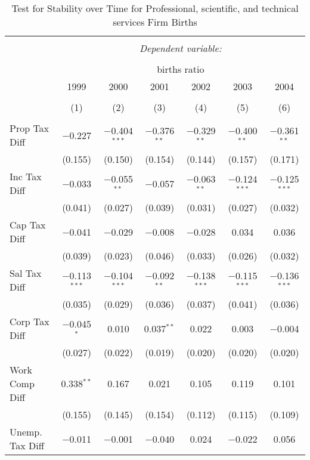 
\begin{table}[!htbp] \centering 
  \caption{Test for Stability over Time for  Professional, scientific, and technical services Firm Births} 
  \label{54year} 
\small 
\begin{tabular}{@{\extracolsep{5pt}}lcccccc} 
\\[-1.8ex]\hline 
\hline \\[-1.8ex] 
 & \multicolumn{6}{c}{\textit{Dependent variable:}} \\ 
\cline{2-7} 
\\[-1.8ex] & \multicolumn{6}{c}{births ratio} \\ 
 & 1999 & 2000 & 2001 & 2002 & 2003 & 2004 \\ 
\\[-1.8ex] & (1) & (2) & (3) & (4) & (5) & (6)\\ 
\hline \\[-1.8ex] 
 Prop Tax Diff & $-$0.227 & $-$0.404$^{***}$ & $-$0.376$^{**}$ & $-$0.329$^{**}$ & $-$0.400$^{**}$ & $-$0.361$^{**}$ \\ 
  & (0.155) & (0.150) & (0.154) & (0.144) & (0.157) & (0.171) \\ 
  Inc Tax Diff & $-$0.033 & $-$0.055$^{**}$ & $-$0.057 & $-$0.063$^{**}$ & $-$0.124$^{***}$ & $-$0.125$^{***}$ \\ 
  & (0.041) & (0.027) & (0.039) & (0.031) & (0.027) & (0.032) \\ 
  Cap Tax Diff & $-$0.041 & $-$0.029 & $-$0.008 & $-$0.028 & 0.034 & 0.036 \\ 
  & (0.039) & (0.023) & (0.046) & (0.033) & (0.026) & (0.032) \\ 
  Sal Tax Diff & $-$0.113$^{***}$ & $-$0.104$^{***}$ & $-$0.092$^{**}$ & $-$0.138$^{***}$ & $-$0.115$^{***}$ & $-$0.136$^{***}$ \\ 
  & (0.035) & (0.029) & (0.036) & (0.037) & (0.041) & (0.036) \\ 
  Corp Tax Diff & $-$0.045$^{*}$ & 0.010 & 0.037$^{**}$ & 0.022 & 0.003 & $-$0.004 \\ 
  & (0.027) & (0.022) & (0.019) & (0.020) & (0.020) & (0.020) \\ 
  Work Comp Diff & 0.338$^{**}$ & 0.167 & 0.021 & 0.105 & 0.119 & 0.101 \\ 
  & (0.155) & (0.145) & (0.154) & (0.112) & (0.115) & (0.109) \\ 
  Unemp. Tax Diff & $-$0.011 & $-$0.001 & $-$0.040 & 0.024 & $-$0.022 & 0.056 \\ 

\end{tabular}
\end{table}
